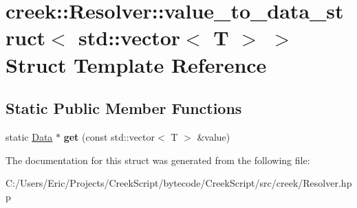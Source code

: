 \hypertarget{structcreek_1_1_resolver_1_1value__to__data__struct_3_01std_1_1vector_3_01_t_01_4_01_4}{}\section{creek\+:\+:Resolver\+:\+:value\+\_\+to\+\_\+data\+\_\+struct$<$ std\+:\+:vector$<$ T $>$ $>$ Struct Template Reference}
\label{structcreek_1_1_resolver_1_1value__to__data__struct_3_01std_1_1vector_3_01_t_01_4_01_4}
\subsection*{Static Public Member Functions}
\begin{DoxyCompactItemize}
\item 
static \hyperlink{classcreek_1_1_data}{Data} $\ast$ {\bfseries get} (const std\+::vector$<$ T $>$ \&value)\hypertarget{structcreek_1_1_resolver_1_1value__to__data__struct_3_01std_1_1vector_3_01_t_01_4_01_4_ad40c01cb6d51dca25f3b7cecd6014da8}{}\label{structcreek_1_1_resolver_1_1value__to__data__struct_3_01std_1_1vector_3_01_t_01_4_01_4_ad40c01cb6d51dca25f3b7cecd6014da8}

\end{DoxyCompactItemize}


The documentation for this struct was generated from the following file\+:\begin{DoxyCompactItemize}
\item 
C\+:/\+Users/\+Eric/\+Projects/\+Creek\+Script/bytecode/\+Creek\+Script/src/creek/Resolver.\+hpp\end{DoxyCompactItemize}
